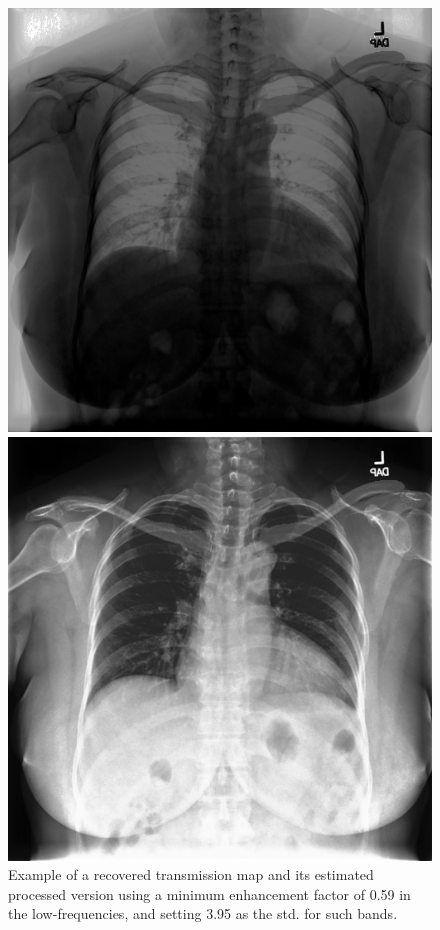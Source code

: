 \documentclass[nomenclature, english, bibtex]{kththesis}
\numberwithin{listing}{chapter}
\begin{document}
\begin{figure}[!tbp]
  \centering
  \begin{minipage}[b]{0.5\textwidth}
    \includegraphics[width=\textwidth]{figures/wrong_character_tm.png}
  \end{minipage}
  \begin{minipage}[b]{0.5\textwidth}
    \includegraphics[width=\textwidth]{figures/wrong_character_proc.png}
  \end{minipage}
  \hfill
  \caption{Example of a recovered transmission map and its estimated processed version using a minimum enhancement factor
  of 0.59 in the low-frequencies, and setting 3.95 as the std. for such bands.}
  \label{fig:wrongCharacterization}
\end{figure}
\end{document}

